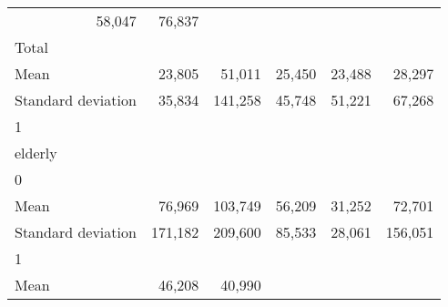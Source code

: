 \begin{tabular}{llllll}
  \multicolumn{1}{r}{58,047} &
  \multicolumn{1}{r}{76,837} \\
\multicolumn{1}{l}{\hspace{3em}Total} &
  \multicolumn{1}{|r}{} &
  \multicolumn{1}{r}{} &
  \multicolumn{1}{r}{} &
  \multicolumn{1}{r}{} &
  \multicolumn{1}{r}{} \\
\multicolumn{1}{l}{\hspace{4em}Mean} &
  \multicolumn{1}{|r}{23,805} &
  \multicolumn{1}{r}{51,011} &
  \multicolumn{1}{r}{25,450} &
  \multicolumn{1}{r}{23,488} &
  \multicolumn{1}{r}{28,297} \\
\multicolumn{1}{l}{\hspace{4em}Standard deviation} &
  \multicolumn{1}{|r}{35,834} &
  \multicolumn{1}{r}{141,258} &
  \multicolumn{1}{r}{45,748} &
  \multicolumn{1}{r}{51,221} &
  \multicolumn{1}{r}{67,268} \\
\multicolumn{1}{l}{\hspace{1em}1} &
  \multicolumn{1}{|r}{} &
  \multicolumn{1}{r}{} &
  \multicolumn{1}{r}{} &
  \multicolumn{1}{r}{} &
  \multicolumn{1}{r}{} \\
\multicolumn{1}{l}{\hspace{2em}elderly} &
  \multicolumn{1}{|r}{} &
  \multicolumn{1}{r}{} &
  \multicolumn{1}{r}{} &
  \multicolumn{1}{r}{} &
  \multicolumn{1}{r}{} \\
\multicolumn{1}{l}{\hspace{3em}0} &
  \multicolumn{1}{|r}{} &
  \multicolumn{1}{r}{} &
  \multicolumn{1}{r}{} &
  \multicolumn{1}{r}{} &
  \multicolumn{1}{r}{} \\
\multicolumn{1}{l}{\hspace{4em}Mean} &
  \multicolumn{1}{|r}{76,969} &
  \multicolumn{1}{r}{103,749} &
  \multicolumn{1}{r}{56,209} &
  \multicolumn{1}{r}{31,252} &
  \multicolumn{1}{r}{72,701} \\
\multicolumn{1}{l}{\hspace{4em}Standard deviation} &
  \multicolumn{1}{|r}{171,182} &
  \multicolumn{1}{r}{209,600} &
  \multicolumn{1}{r}{85,533} &
  \multicolumn{1}{r}{28,061} &
  \multicolumn{1}{r}{156,051} \\
\multicolumn{1}{l}{\hspace{3em}1} &
  \multicolumn{1}{|r}{} &
  \multicolumn{1}{r}{} &
  \multicolumn{1}{r}{} &
  \multicolumn{1}{r}{} &
  \multicolumn{1}{r}{} \\
\multicolumn{1}{l}{\hspace{4em}Mean} &
  \multicolumn{1}{|r}{46,208} &
  \multicolumn{1}{r}{40,990} &

\end{tabular}
